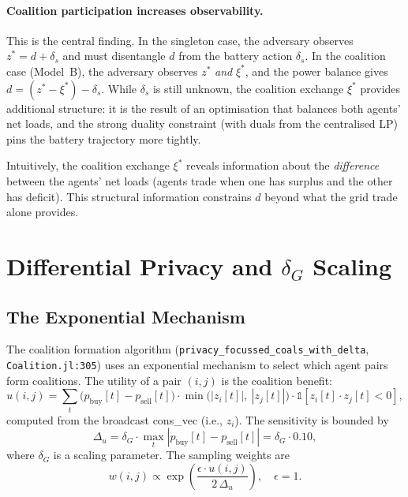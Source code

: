 \documentclass[11pt,a4paper]{article}
\newcommand{\pb}{p_{\text{buy}}}
\newcommand{\ps}{p_{\text{sell}}}
\newcommand{\deltas}{\delta_s}
\newcommand{\netload}{d}
\newcommand{\ce}{\xi}
\begin{document}
\paragraph{Coalition participation increases observability.}
This is the central finding. In the singleton case, the adversary observes $z^* = \netload + \deltas$ and must disentangle $\netload$ from the battery action $\deltas$. In the coalition case (Model~B), the adversary observes $z^*$ \emph{and} $\ce^*$, and the power balance gives $\netload = (z^* - \ce^*) - \deltas$. While $\deltas$ is still unknown, the coalition exchange $\ce^*$ provides additional structure: it is the result of an optimisation that balances both agents' net loads, and the strong duality constraint (with duals from the centralised LP) pins the battery trajectory more tightly.

Intuitively, the coalition exchange $\ce^*$ reveals information about the \emph{difference} between the agents' net loads (agents trade when one has surplus and the other has deficit). This structural information constrains $\netload$ beyond what the grid trade alone provides.

\section{Differential Privacy and \texorpdfstring{$\delta_G$}{delta\_G} Scaling}\label{sec:dp}

\subsection{The Exponential Mechanism}

The coalition formation algorithm (\texttt{privacy\_focussed\_coals\_with\_delta}, \texttt{Coalition.jl:305}) uses an exponential mechanism to select which agent pairs form coalitions. The utility of a pair $(i,j)$ is the coalition benefit:
\begin{equation}
    u(i,j) = \sum_t \bigl(\pb[t] - \ps[t]\bigr) \cdot \min\bigl(|z_i[t]|,\ |z_j[t]|\bigr) \cdot \mathbb{1}[z_i[t] \cdot z_j[t] < 0],
\end{equation}
computed from the broadcast cons\_vec (i.e., $z_i$). The sensitivity is bounded by
\begin{equation}
    \Delta_u = \delta_G \cdot \max_t |\pb[t] - \ps[t]| = \delta_G \cdot 0.10,
\end{equation}
where $\delta_G$ is a scaling parameter. The sampling weights are
\begin{equation}\label{eq:softmax}
    w(i,j) \propto \exp\!\left(\frac{\epsilon \cdot u(i,j)}{2\,\Delta_u}\right), \quad \epsilon = 1.
\end{equation}
\end{document}
